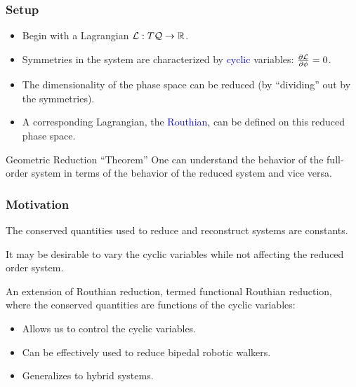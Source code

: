 \begin{frame}[t]
  \frametitle{Setup}
  \begin{description}[D]
  \item[ Geometric reduction\footnote{For more on geometric reduction, see [Marsden, Springer-Verlag 1994]}:] \hspace{5cm}

    \begin{itemize}
    \item Begin with a Lagrangian $\mathcal{L} : T\mathcal{Q} \to \mathbb{R}$.
    \item Symmetries in the system are characterized by \textcolor{blue}{cyclic}
      variables: $\frac{\partial \mathcal{L}}{\partial \phi} = 0$.
    \item The dimensionality of the phase space can be reduced (by ``dividing'' out by the symmetries).
    \item A corresponding Lagrangian, the \textcolor{blue}{Routhian}, can be defined on this reduced phase space.
    \end{itemize}
  \end{description}

  \begin{block}{Geometric Reduction ``Theorem''}
    One can understand the behavior of the full-order system in terms of
    the behavior of the reduced system and vice versa.
  \end{block}
\end{frame}

\begin{frame}[t]
  \frametitle{Motivation}
  \begin{description}[D]
  \item[ Classical Reduction:]  The conserved quantities used to reduce and reconstruct systems are constants.
  \item[ Yet:]  It may be desirable to \alert{vary} the cyclic variables while not affecting the reduced order system.
  \item[ Motivates:]  An extension of Routhian reduction, termed \alert{functional Routhian reduction}, where the conserved quantities are functions of the cyclic variables:
    \begin{itemize}
    \item Allows us to control the cyclic variables.
    \item Can be effectively used to reduce bipedal robotic walkers.
    \item Generalizes to hybrid systems.
    \end{itemize}
  \end{description}
\end{frame}

